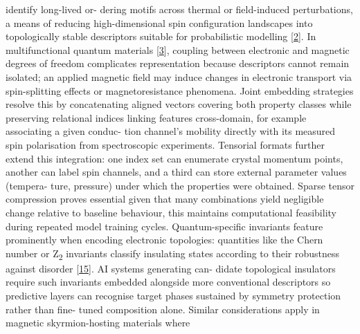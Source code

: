 \documentclass[
]{article}
\begin{document}
identify long-lived or- dering motifs across thermal or field-induced
perturbations, a means of reducing high-dimensional spin configuration
landscapes into topologically stable descriptors suitable for
probabilistic modelling {[}\hyperref[_bookmark42]{2}{]}. In
multifunctional quantum materials {[}\hyperref[_bookmark43]{3}{]},
coupling between electronic and magnetic degrees of freedom complicates
representation because descriptors cannot remain isolated; an applied
magnetic field may induce changes in electronic transport via
spin-splitting effects or magnetoresistance phenomena. Joint embedding
strategies resolve this by concatenating aligned vectors covering both
property classes while preserving relational indices linking features
cross-domain, for example associating a given conduc- tion channel's
mobility directly with its measured spin polarisation from spectroscopic
experiments. Tensorial formats further extend this integration: one
index set can enumerate crystal momentum points, another can label spin
channels, and a third can store external parameter values (tempera-
ture, pressure) under which the properties were obtained. Sparse tensor
compression proves essential given that many combinations yield
negligible change relative to baseline behaviour, this maintains
computational feasibility during repeated model training cycles.
Quantum-specific invariants feature prominently when encoding electronic
topologies: quantities like the Chern number or Z\textsubscript{2}
invariants classify insulating states according to their robustness
against disorder {[}\hyperref[_bookmark55]{15}{]}. AI systems generating
can- didate topological insulators require such invariants embedded
alongside more conventional descriptors so predictive layers can
recognise target phases sustained by symmetry protection rather than
fine- tuned composition alone. Similar considerations apply in magnetic
skyrmion-hosting materials where
\end{document}
